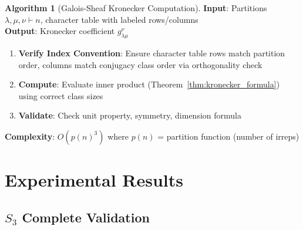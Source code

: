 \documentclass[11pt]{article}
\theoremstyle{definition}
\newtheorem{algorithm}[theorem]{Algorithm}
\theoremstyle{remark}
\begin{document}
\begin{algorithm}[Galois-Sheaf Kronecker Computation]\label{alg:main}
\textbf{Input}: Partitions $\lambda, \mu, \nu \vdash n$, character table with labeled rows/columns \\
\textbf{Output}: Kronecker coefficient $g^\nu_{\lambda\mu}$

\begin{enumerate}
\item \textbf{Verify Index Convention}: Ensure character table rows match partition order, columns match conjugacy class order via orthogonality check
\item \textbf{Compute}: Evaluate inner product (Theorem~\ref{thm:kronecker_formula}) using correct class sizes
\item \textbf{Validate}: Check unit property, symmetry, dimension formula
\end{enumerate}

\textbf{Complexity}: $O(p(n)^3)$ where $p(n)$ = partition function (number of irreps)
\end{algorithm}

\section{Experimental Results}

\subsection{$S_3$ Complete Validation}
\end{document}
